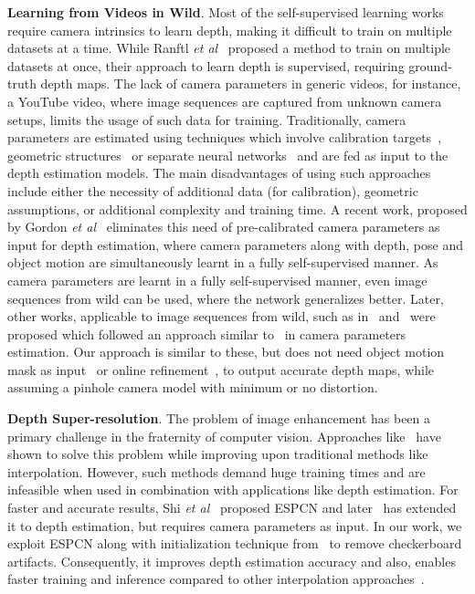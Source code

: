 \documentclass{bmvc2k}
\def\etal{\emph{et al}\bmvaOneDot}
\begin{document}
\textbf{Learning from Videos in Wild}. Most of the self-supervised learning works~\cite{zhou2017unsupervised, godard2019digging, yin2018geonet, casser2019depth} require camera intrinsics to learn depth, making it difficult to train on multiple datasets at a time. While Ranftl \etal~\cite{midas} proposed a method to train on multiple datasets at once, their approach to learn depth is supervised, requiring ground-truth depth maps. The lack of camera parameters in generic videos, for instance, a YouTube video, where image sequences are captured from unknown camera setups, limits the usage of such data for training. Traditionally, camera parameters are estimated using techniques which involve calibration targets~\cite{mei2007single, shah1994simple, ying2008identical}, geometric structures~\cite{barreto2005geometric, zhang2015line} or separate neural networks~\cite{bogdan2018deepcalib, Facil_2019_CVPR} and are fed as input to the depth estimation models. The main disadvantages of using such approaches include either the necessity of additional data (for calibration), geometric assumptions, or additional complexity and training time. A recent work, proposed by Gordon \etal~\cite{gordon2019depth} eliminates this need of pre-calibrated camera parameters as input for depth estimation, where camera parameters along with depth, pose and object motion are simultaneously learnt in a fully self-supervised manner. As camera parameters are learnt in a fully self-supervised manner, even image sequences from wild can be used, where the network generalizes better. Later, other works, applicable to image sequences from wild, such as in~\cite{chen2019self} and~\cite{tosi2020distilled} were proposed which followed an approach similar to~\cite{gordon2019depth} in camera parameters estimation. Our approach is similar to these, but does not need object motion mask as input~\cite{gordon2019depth, tosi2020distilled} or online refinement~\cite{chen2019self}, to output accurate depth maps, while assuming a pinhole camera model with minimum or no distortion.


\textbf{Depth Super-resolution}. The problem of image enhancement has been a primary challenge in the fraternity of computer vision. Approaches like~\cite{dong2014learning,simonyan2014very,kim2016deeply, ledig2017photo} have shown to solve this problem while improving upon traditional methods like interpolation. However, such methods demand huge training times and are infeasible when used in combination with applications like depth estimation. For faster and accurate results, Shi \etal~\cite{shi2016real} proposed ESPCN and later~\cite{pillai2019superdepth} has extended it to depth estimation, but requires camera parameters as input. In our work, we exploit ESPCN along with initialization technique from~\cite{aitken2017checkerboard} to remove checkerboard artifacts. Consequently, it improves depth estimation accuracy and also, enables faster training and inference compared to other interpolation approaches~\cite{shi2016real}. 
\end{document}
